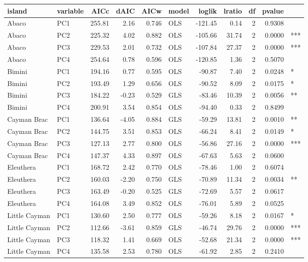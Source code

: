 
\begin{tabular}{llrrrlrrrrl}
\toprule
island & variable & AICc & dAIC & AICw & model & loglik & lratio & df & pvalue &  \\
\midrule
Abaco & PC1 & 255.81 & 2.16 & 0.746 & OLS & -121.45 & 0.14 & 2 & 0.9308 & \\
Abaco & PC2 & 225.32 & 4.02 & 0.882 & OLS & -105.66 & 31.74 & 2 & 0.0000 & ***\\
Abaco & PC3 & 229.53 & 2.01 & 0.732 & OLS & -107.84 & 27.37 & 2 & 0.0000 & ***\\
Abaco & PC4 & 254.64 & 0.78 & 0.596 & OLS & -120.85 & 1.36 & 2 & 0.5070 & \\
Bimini & PC1 & 194.16 & 0.77 & 0.595 & OLS & -90.87 & 7.40 & 2 & 0.0248 & *\\
Bimini & PC2 & 193.49 & 1.29 & 0.656 & OLS & -90.52 & 8.09 & 2 & 0.0175 & *\\
Bimini & PC3 & 184.22 & -0.23 & 0.529 & GLS & -83.46 & 10.39 & 2 & 0.0056 & **\\
Bimini & PC4 & 200.91 & 3.54 & 0.854 & OLS & -94.40 & 0.33 & 2 & 0.8499 & \\
Cayman Brac & PC1 & 136.64 & -4.05 & 0.884 & GLS & -59.29 & 13.81 & 2 & 0.0010 & **\\
Cayman Brac & PC2 & 144.75 & 3.51 & 0.853 & OLS & -66.24 & 8.41 & 2 & 0.0149 & *\\
Cayman Brac & PC3 & 127.13 & 2.77 & 0.800 & OLS & -56.86 & 27.16 & 2 & 0.0000 & ***\\
Cayman Brac & PC4 & 147.37 & 4.33 & 0.897 & OLS & -67.63 & 5.63 & 2 & 0.0600 & \\
Eleuthera & PC1 & 168.72 & 2.42 & 0.770 & OLS & -78.46 & 1.00 & 2 & 0.6074 & \\
Eleuthera & PC2 & 160.03 & -2.20 & 0.750 & GLS & -70.89 & 11.34 & 2 & 0.0034 & **\\
Eleuthera & PC3 & 163.49 & -0.20 & 0.525 & GLS & -72.69 & 5.57 & 2 & 0.0617 & \\
Eleuthera & PC4 & 164.08 & 3.49 & 0.852 & OLS & -76.01 & 5.89 & 2 & 0.0525 & \\
Little Cayman & PC1 & 130.60 & 2.50 & 0.777 & OLS & -59.26 & 8.18 & 2 & 0.0167 & *\\
Little Cayman & PC2 & 112.66 & -3.61 & 0.859 & GLS & -46.74 & 29.76 & 2 & 0.0000 & ***\\
Little Cayman & PC3 & 118.32 & 1.41 & 0.669 & OLS & -52.68 & 21.34 & 2 & 0.0000 & ***\\
Little Cayman & PC4 & 135.58 & 2.53 & 0.780 & OLS & -61.92 & 2.85 & 2 & 0.2410 & \\

\end{tabular}
